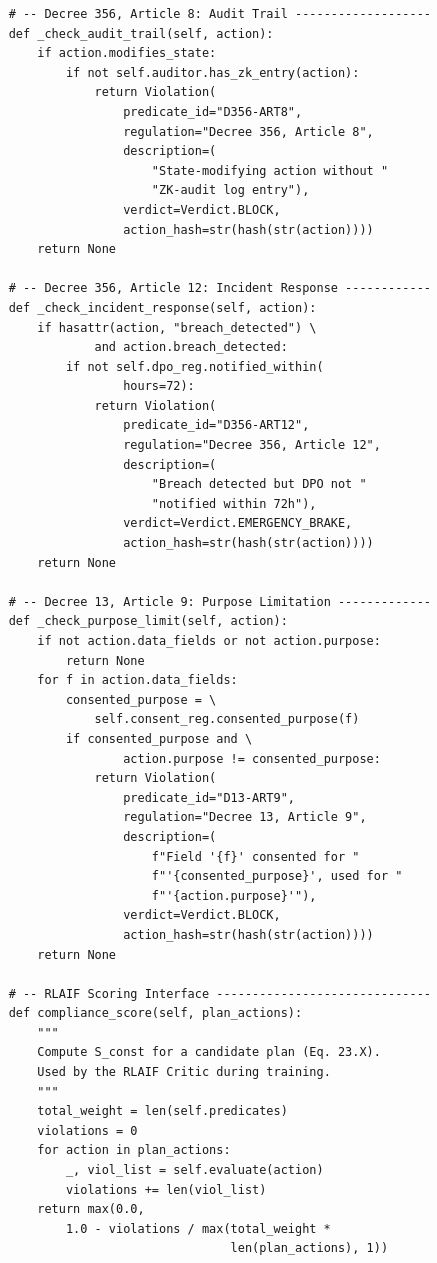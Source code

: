 \begin{lstlisting}
    # -- Decree 356, Article 8: Audit Trail -------------------
    def _check_audit_trail(self, action):
        if action.modifies_state:
            if not self.auditor.has_zk_entry(action):
                return Violation(
                    predicate_id="D356-ART8",
                    regulation="Decree 356, Article 8",
                    description=(
                        "State-modifying action without "
                        "ZK-audit log entry"),
                    verdict=Verdict.BLOCK,
                    action_hash=str(hash(str(action))))
        return None

    # -- Decree 356, Article 12: Incident Response ------------
    def _check_incident_response(self, action):
        if hasattr(action, "breach_detected") \
                and action.breach_detected:
            if not self.dpo_reg.notified_within(
                    hours=72):
                return Violation(
                    predicate_id="D356-ART12",
                    regulation="Decree 356, Article 12",
                    description=(
                        "Breach detected but DPO not "
                        "notified within 72h"),
                    verdict=Verdict.EMERGENCY_BRAKE,
                    action_hash=str(hash(str(action))))
        return None

    # -- Decree 13, Article 9: Purpose Limitation -------------
    def _check_purpose_limit(self, action):
        if not action.data_fields or not action.purpose:
            return None
        for f in action.data_fields:
            consented_purpose = \
                self.consent_reg.consented_purpose(f)
            if consented_purpose and \
                    action.purpose != consented_purpose:
                return Violation(
                    predicate_id="D13-ART9",
                    regulation="Decree 13, Article 9",
                    description=(
                        f"Field '{f}' consented for "
                        f"'{consented_purpose}', used for "
                        f"'{action.purpose}'"),
                    verdict=Verdict.BLOCK,
                    action_hash=str(hash(str(action))))
        return None

    # -- RLAIF Scoring Interface ------------------------------
    def compliance_score(self, plan_actions):
        """
        Compute S_const for a candidate plan (Eq. 23.X).
        Used by the RLAIF Critic during training.
        """
        total_weight = len(self.predicates)
        violations = 0
        for action in plan_actions:
            _, viol_list = self.evaluate(action)
            violations += len(viol_list)
        return max(0.0,
            1.0 - violations / max(total_weight *
                                   len(plan_actions), 1))
\end{lstlisting}

